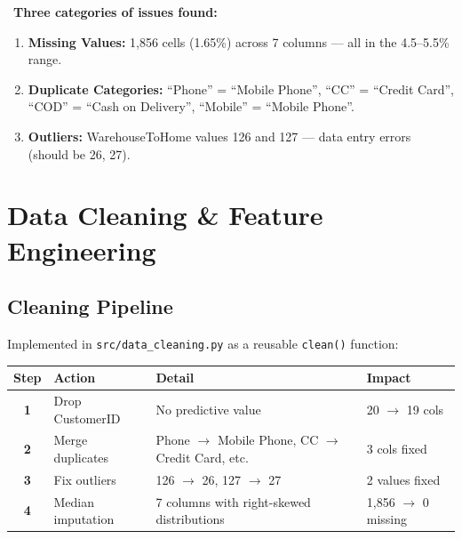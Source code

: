 \documentclass[11pt,a4paper]{article}
\newcommand{\tech}[1]{\texttt{\small\color{primarydark}#1}}
\begin{document}
\begin{warnbox}
\faExclamationTriangle\ \textbf{Three categories of issues found:}
\begin{enumerate}[leftmargin=*, label=\textcolor{warning}{\arabic*.}]
    \item \textbf{Missing Values:} 1,856 cells (1.65\%) across 7 columns --- all in the 4.5--5.5\% range.
    \item \textbf{Duplicate Categories:} ``Phone'' = ``Mobile Phone'', ``CC'' = ``Credit Card'', ``COD'' = ``Cash on Delivery'', ``Mobile'' = ``Mobile Phone''.
    \item \textbf{Outliers:} WarehouseToHome values 126 and 127 --- data entry errors (should be 26, 27).
\end{enumerate}
\end{warnbox}

\section{Data Cleaning \& Feature Engineering}

\subsection{Cleaning Pipeline}

Implemented in \tech{src/data\_cleaning.py} as a reusable \tech{clean()} function:

\begin{table}[H]
\centering
{}
\begin{tabularx}{\textwidth}{>{\bfseries}c l X l}
\toprule
\textbf{Step} & \textbf{Action} & \textbf{Detail} & \textbf{Impact} \\
\midrule
1 & Drop CustomerID & No predictive value & 20 $\rightarrow$ 19 cols \\
2 & Merge duplicates & Phone $\rightarrow$ Mobile Phone, CC $\rightarrow$ Credit Card, etc. & 3 cols fixed \\
3 & Fix outliers & 126 $\rightarrow$ 26, 127 $\rightarrow$ 27 & 2 values fixed \\
4 & Median imputation & 7 columns with right-skewed distributions & 1,856 $\rightarrow$ 0 missing \\
\bottomrule
\end{tabularx}
\end{table}
\end{document}

